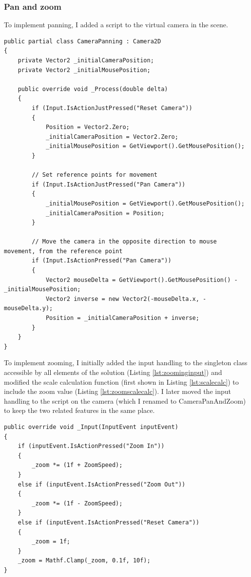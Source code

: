 \documentclass{article}
\begin{document}
\subsubsection{Pan and zoom}
To implement panning, I added a script to the virtual camera in the scene.
\lstset{style=csharp}
\begin{lstlisting}[caption=Camera panning script]
public partial class CameraPanning : Camera2D
{
    private Vector2 _initialCameraPosition;
    private Vector2 _initialMousePosition;

    public override void _Process(double delta)
    {
        if (Input.IsActionJustPressed("Reset Camera"))
        {
            Position = Vector2.Zero;
            _initialCameraPosition = Vector2.Zero;
            _initialMousePosition = GetViewport().GetMousePosition();
        }

        // Set reference points for movement
        if (Input.IsActionJustPressed("Pan Camera"))
        {
            _initialMousePosition = GetViewport().GetMousePosition();
            _initialCameraPosition = Position;
        }

        // Move the camera in the opposite direction to mouse movement, from the reference point
        if (Input.IsActionPressed("Pan Camera"))
        {
            Vector2 mouseDelta = GetViewport().GetMousePosition() - _initialMousePosition;
            Vector2 inverse = new Vector2(-mouseDelta.x, -mouseDelta.y);
            Position = _initialCameraPosition + inverse;
        }
    }
}
\end{lstlisting}
To implement zooming, I initially added the input handling to the singleton class accessible by all elements of the solution (Listing \ref{lst:zoominginput}) and modified the scale calculation function (first shown in Listing \ref{lst:scalecalc}) to include the zoom value (Listing \ref{lst:zoomscalecalc}).
I later moved the input handling to the script on the camera (which I renamed to CameraPanAndZoom) to keep the two related features in the same place.
\lstset{style=csharp}
\begin{lstlisting}[label={lst:zoominginput},caption=Camera zooming]
public override void _Input(InputEvent inputEvent)
{
    if (inputEvent.IsActionPressed("Zoom In"))
    {
        _zoom *= (1f + ZoomSpeed);
    }
    else if (inputEvent.IsActionPressed("Zoom Out"))
    {
        _zoom *= (1f - ZoomSpeed);
    }
    else if (inputEvent.IsActionPressed("Reset Camera"))
    {
        _zoom = 1f;
    }
    _zoom = Mathf.Clamp(_zoom, 0.1f, 10f);
}
\end{lstlisting}
\end{document}

